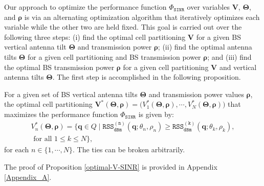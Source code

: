 Our approach to optimize the performance function $\Phi_{\mathtt{SINR}}$ over variables $\bm{V}$, $\bm{\Theta}$, and $\bm{\rho}$ is via an alternating optimization algorithm that iteratively optimizes each variable while the other two are held fixed. This goal is carried out over the following three steps: (i) find the optimal cell partitioning $\bm{V}$ for a given BS vertical antenna tilt $\bm{\Theta}$ and transmission power $\bm{\rho}$; (ii) find the optimal antenna tilts $\bm{\Theta}$ for a given cell partitioning and BS transmission power $\bm{\rho}$; and (iii) find the optimal BS transmission power $\bm{\rho}$ for a given cell partitioning $\bm{V}$ and vertical antenna tilts $\bm{\Theta}$. The first step is accomplished in the following proposition. 
\begin{Proposition}\label{optimal-V-SINR}
For a given set of BS vertical antenna tilts $\bm{\Theta}$ and transmission power values $\bm{\rho}$, the optimal cell partitioning $\bm{V}^*(\bm{\Theta}, \bm{\rho}) = \big(V_1^*(\bm{\Theta}, \bm{\rho}), \cdots, V_N^*(\bm{\Theta}, \bm{\rho})\big)$ that maximizes the performance function $\Phi_{\mathtt{SINR}}$ is given by:
\begin{multline}\label{optimal-cell-partitioning-SINR}
    \!\!\! V_n^*(\bm{\Theta}, \bm{\rho}) \!=\! \big\{\bm{q} \in Q \mid \mathtt{RSS_{dBm}^{(n)}}(\bm{q}; \theta_n, \rho_n) \geq \mathtt{RSS_{dBm}^{(k)}}(\bm{q}; \theta_k, \rho_k), \\ \textrm{ for all } 1 \leq k \leq N \big\},
\end{multline}
for each $n \in \{1, \cdots, N\}$. The ties can be broken arbitrarily.
\end{Proposition}
\noindent The proof of Proposition \ref{optimal-V-SINR} is provided in Appendix \ref{Appendix_A}.


